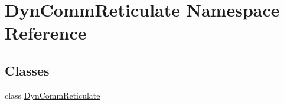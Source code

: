 \hypertarget{namespaceDynCommReticulate}{}\section{Dyn\+Comm\+Reticulate Namespace Reference}
\label{namespaceDynCommReticulate}
\subsection*{Classes}
\begin{DoxyCompactItemize}
\item 
class \hyperlink{classDynCommReticulate_1_1DynCommReticulate}{Dyn\+Comm\+Reticulate}
\end{DoxyCompactItemize}
